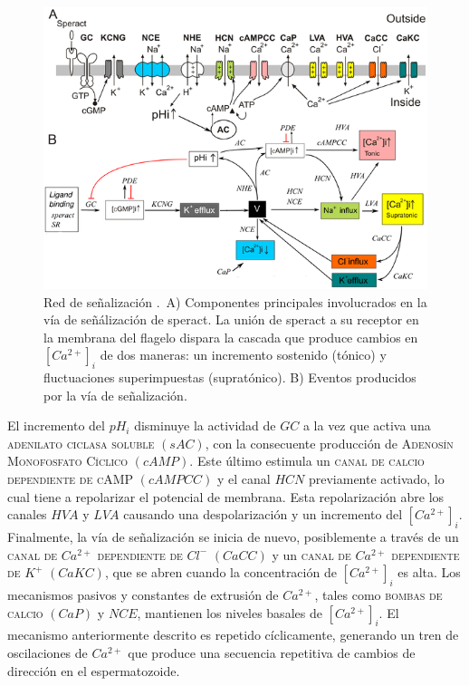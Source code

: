 \begin{figure}[hbt]
\includegraphics[width=0.9\linewidth]{gfx/redErizoBioquimica}
\caption[Red de se\~nalizaci\'on]{Red de se\~nalizaci\'on \citeauthor{Espinal2011} \citep{Espinal2011}.\ A) Componentes principales involucrados en la vía de señálización de speract. La unión de speract a su receptor en la membrana del flagelo dispara la cascada que produce cambios en $[Ca^{2+}]_i$ de dos maneras: un incremento sostenido (tónico) y fluctuaciones superimpuestas (supratónico). B) Eventos producidos por la vía de señalización.}\label{fig:erizobBioquimica}
\end{figure}

El incremento del $pH_i$ disminuye la actividad de $GC$ a la vez que activa una \textsc{adenilato ciclasa soluble} $(sAC)$, con la consecuente producción de \textsc{Adenosín Monofosfato Cíclico} $(cAMP)$. Este último estimula un \textsc{canal de calcio dependiente de cAMP} $(cAMPCC)$ y el canal $HCN$ previamente activado, lo cual tiene a repolarizar el potencial de membrana. Esta repolarización abre los canales $HVA$ y $LVA$ causando una despolarización y un incremento del $[Ca^{2+}]_i$. Finalmente, la vía de señalización se inicia de nuevo, posiblemente a través de un \textsc{canal de} $Ca^{2+}$ \textsc{dependiente de} $Cl^-$ $(CaCC)$ y un \textsc{canal de} $Ca^{2+}$ \textsc{dependiente de} $K^+$ $(CaKC)$, que se abren cuando la concentración de $[Ca^{2+}]_i$ es alta. Los mecanismos pasivos y constantes de extrusión de $Ca^{2+}$, tales como \textsc{bombas de calcio} $(CaP)$ y $NCE$, mantienen los niveles basales de $[Ca^{2+}]_i$. El mecanismo anteriormente descrito es repetido cíclicamente, generando un tren de oscilaciones de $Ca^{2+}$ que produce una secuencia repetitiva de cambios de dirección en el espermatozoide. 

